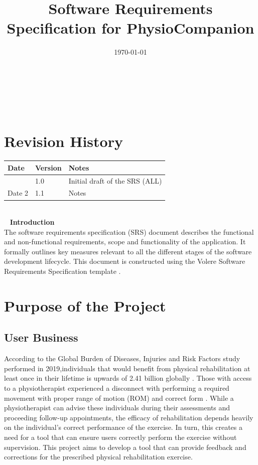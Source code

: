 \documentclass[12pt]{article}
\begin{document}
\title{Software Requirements Specification for PhysioCompanion}
\author{\authname}
\date{\today}
	
\maketitle

~\newpage


\tableofcontents

~\newpage

\section*{Revision History}

\begin{tabularx}{\textwidth}{p{3cm}p{2cm}X}
\toprule {\textbf{Date}} & {\textbf{Version}} & {\textbf{Notes}}\\
\midrule
& 1.0 & Initial draft of the SRS (ALL)\\ 
Date 2 & 1.1 & Notes\\
\bottomrule
\end{tabularx}

~\\

~\newpage
\noindent \textbf{ \large Introduction}\\
The software requirements specification (SRS) document describes the functional and non-functional requirements, scope and functionality of the application. It formally outlines key measures relevant to all the different stages of the software development lifecycle. This document is constructed using the Volere Software Requirements Specification template  \citep{VolereTemplate2012}.

\section{Purpose of the Project}
\subsection{User Business}
According to the Global Burden of Diseases, Injuries and Risk Factors study performed in 2019,individuals that would benefit from physical rehabilitation at least once in their lifetime is upwards of 2.41 billion globally \citep{CiezaEtAl2021}. Those with access to a physiotherapist experienced a disconnect with performing a required movement with proper range of motion (ROM) and correct form \citep{FaberEtAl2015}. While a physiotherapist can advise these individuals during their assessments and proceeding follow-up appointments, the efficacy of rehabilitation depends heavily on the individual's correct performance of the exercise. In turn, this creates a need for a tool that can ensure users correctly perform the exercise without supervision. This project aims to develop a tool that can provide feedback and corrections for the prescribed physical rehabilitation exercise.
\end{document}

